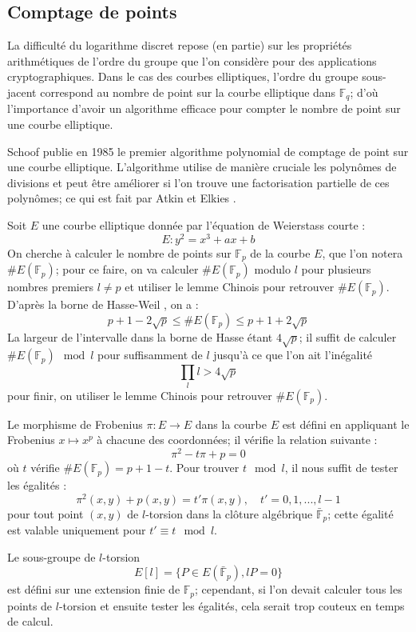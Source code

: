 \documentclass[a4paper]{article}
\theoremstyle{definition}
\theoremstyle{remark}
\numberwithin{equation}{section}
\begin{document}
\subsection{Comptage de points}
La difficulté du logarithme discret repose (en partie) sur les propriétés arithmétiques de l'ordre du groupe que l'on considère pour des applications cryptographiques. Dans le cas des courbes elliptiques, l'ordre du groupe sous-jacent correspond au nombre de point sur la courbe elliptique dans $\mathbb{F}_q$; d'où l'importance d'avoir un algorithme efficace pour compter le nombre de point sur une courbe elliptique.

Schoof \cite{schoof} publie en 1985 le premier algorithme polynomial de comptage de point sur une courbe elliptique. L'algorithme utilise de manière cruciale les polynômes de divisions et peut être améliorer si l'on trouve une factorisation partielle de ces polynômes; ce qui est fait par Atkin \cite{atkin} et Elkies \cite{elkies}.

Soit $E$ une courbe elliptique donnée par l'équation de Weierstass courte :
$$E : y^2 = x^3 + ax + b$$
On cherche à calculer le nombre de points sur $\mathbb{F}_p$ de la courbe $E$, que l'on notera $\#E(\mathbb{F}_p)$; pour ce faire, on va calculer $\#E(\mathbb{F}_p)$ modulo $l$ pour plusieurs nombres premiers $l \neq p$ et utiliser le lemme Chinois pour retrouver $\#E(\mathbb{F}_p)$. D'après la borne de Hasse-Weil \cite{weil}, on a :
$$p+1 - 2\sqrt{p} \leq \#E(\mathbb{F}_p) \leq p+1 + 2\sqrt{p}$$
La largeur de l'intervalle dans la borne de Hasse étant $4\sqrt{p}$; il suffit de calculer $\#E(\mathbb{F}_p) \mod l$ pour suffisamment de $l$ jusqu'à ce que l'on ait l'inégalité
\begin{equation}
\label{inegaliteSchoof}
\prod_l l > 4\sqrt{p}
\end{equation}
pour finir, on utiliser le lemme Chinois pour retrouver $\#E(\mathbb{F}_p)$.

Le morphisme de Frobenius $\pi : E \longrightarrow E$ dans la courbe $E$ est défini en appliquant le Frobenius $x \mapsto x^p$ à chacune des coordonnées; il vérifie la relation suivante :
$$\pi^2 - t\pi + p = 0$$
où $t$ vérifie $\#E(\mathbb{F}_p) = p + 1 - t$. Pour trouver $t \mod l$, il nous suffit de tester les égalités :
$$\pi^2(x,y) + p(x,y) = t'\pi(x,y), \quad t' = 0,1,...,l-1$$
pour tout point $(x,y)$ de $l$-torsion dans la clôture algébrique $\bar{\mathbb{F}}_p$; cette égalité est valable uniquement pour $t' \equiv t \mod l$.

Le sous-groupe de $l$-torsion
$$E[l] = \{P \in E(\bar{\mathbb{F}}_p), lP = 0\}$$
est défini sur une extension finie de $\mathbb{F}_p$; cependant, si l'on devait calculer tous les points de $l$-torsion et ensuite tester les égalités, cela serait trop couteux en temps de calcul.
\end{document}
